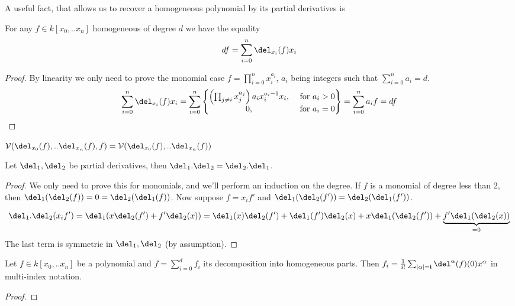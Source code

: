A useful fact, that allows us to recover a homogeneous polynomial by its partial derivatives is

\begin{proposition}
For any $f \in k[x_0,..x_n]$ homogeneous of degree $d$ we have the equality
\[ df = \sum_{i=0}^n \del_{x_i}(f)x_i \]
\end{proposition}
\begin{proof}
By linearity we only need to prove the monomial case $f = \prod_{i=0}^n x_i^{a_i}$, $a_i$ being integers such that $\sum_{i=0}^n a_i = d$.
\begin{equation}
\sum_{i=0}^n \del_{x_i}(f)x_i
= \sum_{i=0}^n \begin{Bmatrix} \left(\prod_{j\neq i} x_j^{a_j}\right) a_i x_i^{a_i-1} x_i, & \text{ for } a_i > 0
\\ 0, &\text{ for } a_i = 0 \end{Bmatrix}
= \sum_{i=0}^n a_i f = df
\end{equation}
\end{proof}

\begin{corollary}
$\V(\del_{x_0}(f),..\del_{x_n}(f), f) = \V(\del_{x_0}(f),..\del_{x_n}(f))$
\end{corollary}


\begin{lemma}
Let $\del_1,\del_2$ be partial derivatives, then $\del_1.\del_2 = \del_2.\del_1$.
\end{lemma}
\begin{proof}
We only need to prove this for monomials, and we'll perform an induction on the degree.
If $f$ is a monomial of degree less than 2, then $\del_1(\del_2(f)) = 0 = \del_2(\del_1(f))$. 
Now suppose $f = x_if'$ and $\del_1(\del_2(f')) = \del_2(\del_1(f'))$.

\begin{equation}
\del_1.\del_2(x_if') = \del_1(x\del_2(f') + f'\del_2(x)) = 
\del_1(x)\del_2(f') + \del_1(f')\del_2(x) + x\del_1(\del_2(f')) + \underset{=0}{\underbrace{f'\del_1(\del_2(x))}}
\end{equation}
The last term is symmetric in $\del_1,\del_2$ (by assumption).
\end{proof}

\begin{corollary}
Let $f \in k[x_0,..x_n]$ be a polynomial and $f = \sum_{i=0}^d f_i$ its decomposition into homogeneous parts.
Then $f_i = \frac{1}{i!} \sum_{|\bf{\alpha}|=i} \del^{\bf{\alpha}}(f)(0)x^{\bf{\alpha}}$ in multi-index notation.
\end{corollary}
\begin{proof}
\end{proof}






